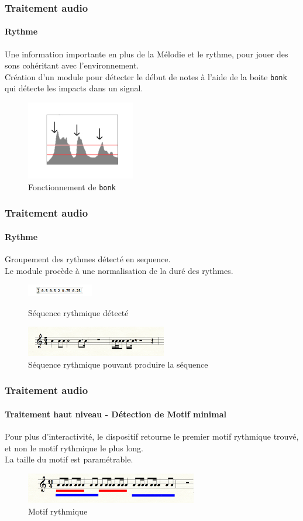 \documentclass{beamer}
\begin{document}
\begin{frame}
\frametitle{Traitement audio}
\framesubtitle{Rythme}
Une information importante en plus de la Mélodie et le rythme, pour jouer des sons cohéritant avec l’environnement.\\
Création d'un module pour détecter le début de notes à l'aide de la boite \texttt{bonk} qui détecte les impacts dans un signal.

\begin{figure}
\centering
\includegraphics[height=130px]{bonk.jpg}
\caption{Fonctionnement de \texttt{bonk}}
\end{figure}
\end{frame}


\begin{frame}
\frametitle{Traitement audio}
\framesubtitle{Rythme}
Groupement des rythmes détecté en sequence.\\
Le module procède à une normalisation de la duré des rythmes.
\begin{figure}
\centering
\includegraphics[height=20px]{rythme.jpg}
\caption{Séquence rythmique détecté}
\includegraphics[height=50px]{structurerythme.jpg}
\caption{Séquence rythmique pouvant produire la séquence}
\end{figure}
\end{frame}

\begin{frame}
\frametitle{Traitement audio}
\framesubtitle{Traitement haut niveau - Détection de Motif minimal}
Pour plus d'interactivité, le dispositif retourne le premier motif rythmique trouvé, et non le motif rythmique le plus long.\\
La taille du motif est paramétrable.
\begin{figure}
\centering
\includegraphics[height=50px]{motifrythme.jpg}
\caption{Motif rythmique}
\end{figure}
\end{frame}
\end{document}
